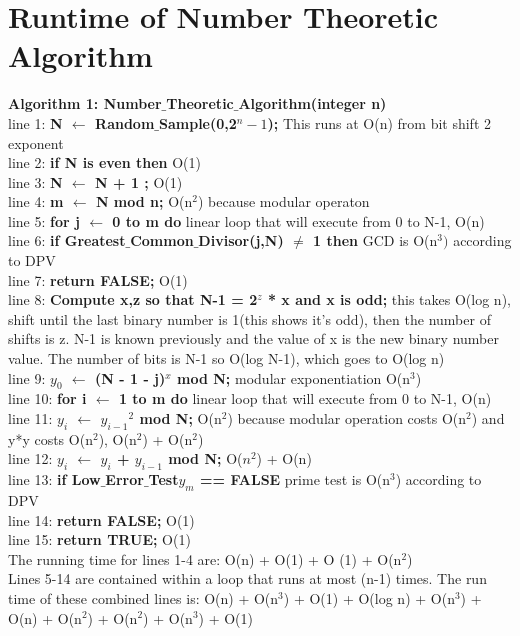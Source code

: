 \documentclass[fleqn]{article}
\begin{document}
\section{Runtime of Number Theoretic Algorithm}
\textbf{Algorithm 1: Number$\_$Theoretic$\_$Algorithm(integer n)}\\
line 1: \textbf{N $\leftarrow$ Random$\_$Sample(0,2$^{n}-1$);} This runs at O(n) from bit shift 2 exponent\\
line 2: \textbf{if N is even then}  O(1)\\
line 3: \textbf{N $\leftarrow$ N + 1 ;}  O(1)\\
line 4: \textbf{m $\leftarrow$ N mod n;} O(n$^{2}$) because modular operaton\\
line 5: \textbf{for j $\leftarrow$ 0 to m do} linear loop that will execute from 0 to N-1, O(n)\\
line 6: \textbf{if Greatest$\_$Common$\_$Divisor(j,N) $\neq$ 1 then} GCD is O(n$^{3})$ according to DPV\\
line 7: \textbf{return FALSE;} O(1)\\
line 8: \textbf{Compute x,z so that N-1 = 2$^{z}$ * x and x is odd;} this takes O(log n), shift until the last binary number is 1(this shows it's odd), then the number of shifts is z. N-1 is known previously and the value of x is the new binary number value. The number of bits is N-1 so O(log N-1), which goes to O(log n)\\
line 9: \textbf{${y_0}$ $\leftarrow$ (N - 1 - j)$^{x}$ mod N;} modular exponentiation O(n$^{3}$)\\
line 10: \textbf{for i $\leftarrow$ 1 to m do} linear loop that will execute from 0 to N-1, O(n)\\
line 11: \textbf{${y_i}$ $\leftarrow$ ${y_{i-1}}^{2}$ mod N;} O(n$^2$) because modular operation costs O(n$^2$) and y*y costs O(n$^2$), O(n$^2$) + O(n$^2$)\\
line 12: \textbf{${y_i}$ $\leftarrow$ ${y_i}$ + ${y_{i - 1}}$ mod N;} O($n^{2}$) + O(n)\\
line 13: \textbf{if Low$\_$Error$\_$Test${y_m}$ == FALSE} prime test is O(n$^{3}$) according to DPV\\
line 14: \textbf{return FALSE;} O(1) \\
line 15: \textbf{return TRUE;} O(1)\\
The running time for lines 1-4 are: O(n) + O(1) + O (1) + O(n$^{2}$)\\
Lines 5-14 are contained within a loop that runs at most (n-1) times. The run time of these combined lines is: O(n) + O(n$^{3}$) + O(1) + O(log n) + O(n$^{3}$) + O(n) + O(n$^2$) + O(n$^2$) + O(n$^3$) + O(1)\\
\end{document}
